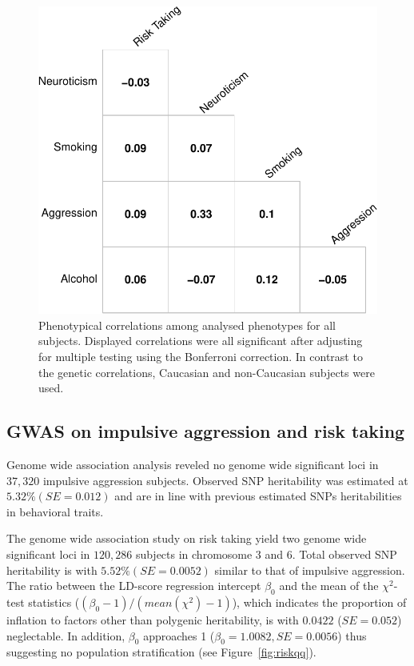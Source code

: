 \begin{figure}[htpb]
  \centering
  \includegraphics[width=0.6\linewidth]{ukb_assoc/figure/phenotype/corr_plot_ci.pdf} 
  \caption{
    Phenotypical correlations among analysed phenotypes for all subjects.
    Displayed correlations were all significant after adjusting for multiple testing using the Bonferroni correction.
    In contrast to the genetic correlations, Caucasian and non-Caucasian subjects were used.
  }\label{fig:corr_pheno}
\end{figure}

\subsection{GWAS on impulsive aggression and risk taking}
\label{sub:gwas}

Genome wide association analysis reveled no genome wide significant loci in $37,320$ impulsive aggression subjects.
Observed SNP heritability was estimated at $5.32\% (SE=0.012)$ and are in line with previous estimated SNPs heritabilities in behavioral traits.

The genome wide association study on risk taking yield two genome wide significant loci in $120,286$ subjects in chromosome 3 and 6.
Total observed SNP heritability is with $5.52\% (SE=0.0052)$ similar to that of impulsive aggression.
The ratio between the LD-score regression intercept $\beta_0$ and the mean of the $\chi^2$-test statistics ($(\beta_0 - 1)/(mean(\chi^2)-1)$),
which indicates the proportion of inflation to factors other than polygenic heritability, is with $0.0422$ ($SE=0.052$) neglectable.
In addition, $\beta_0$ approaches 1 ($\beta_0=1.0082, SE=0.0056$) thus suggesting no population stratification (see Figure~\ref{fig:riskqq}).

